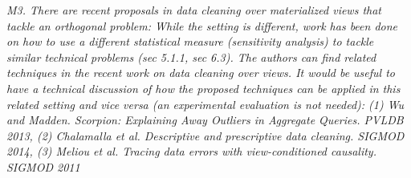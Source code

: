 \vspace{1em}
\emph{M3. There are recent proposals in data cleaning over materialized views that tackle an orthogonal problem: While the setting is different, work has been done on how to use a different statistical measure (sensitivity analysis) to tackle similar technical problems (sec 5.1.1, sec 6.3). The authors can find related techniques in the recent work on data cleaning over views. It would be useful to have a technical discussion of how the proposed techniques can be applied in this related setting and vice versa (an experimental evaluation is not needed): (1) Wu and Madden. Scorpion: Explaining Away Outliers in Aggregate Queries. PVLDB 2013, (2) Chalamalla et al. Descriptive and prescriptive data cleaning. SIGMOD 2014, (3) Meliou et al. Tracing data errors with view-conditioned causality. SIGMOD 2011}

\vspace{.25em}

